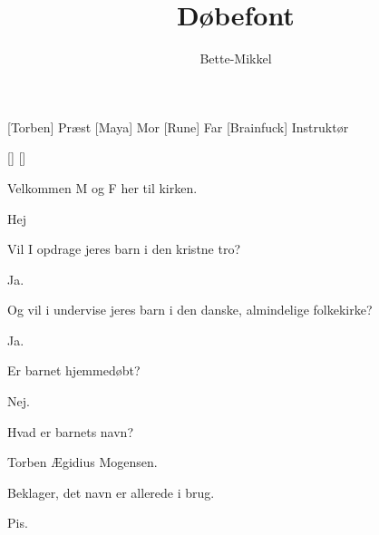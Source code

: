 \documentclass[a4paper,11pt]{article}
\title{Døbefont}
\author{Bette-Mikkel}
\begin{document}
\maketitle

\begin{roles}
[Torben] Præst
[Maya] Mor
[Rune] Far
[Brainfuck] Instruktør
\end{roles}

\begin{props}
    []
    []
\end{props}


\begin{sketch}

 Velkommen M og F her til kirken.

 Hej

 Vil I opdrage jeres barn i den kristne tro?

 Ja.

 Og vil i undervise jeres barn i den danske, almindelige folkekirke?

 Ja.


 Er barnet hjemmedøbt?

 Nej.

 Hvad er barnets navn?

 Torben Ægidius Mogensen.


 Beklager, det navn er allerede i brug.

 Pis.


\end{sketch}
\end{document}
